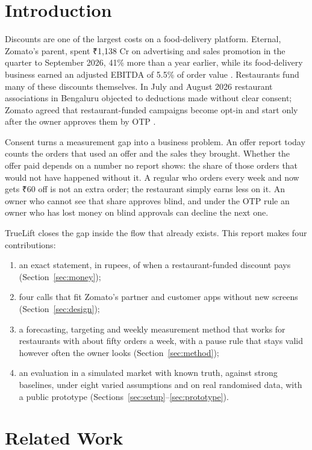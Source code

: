 \documentclass[conference]{IEEEtran}
\begin{document}
\section{Introduction}

Discounts are one of the largest costs on a food-delivery platform. Eternal, Zomato's parent, spent
₹1,138 Cr on advertising and sales promotion in the quarter to September 2026, 41\% more than a year
earlier, while its food-delivery business earned an adjusted EBITDA of 5.5\% of order value
\cite{eternal}. Restaurants fund many of these discounts themselves. In July and August 2026 restaurant
associations in Bengaluru objected to deductions made without clear consent; Zomato agreed that
restaurant-funded campaigns become opt-in and start only after the owner approves them by OTP
\cite{angelone,theweek}.

Consent turns a measurement gap into a business problem. An offer report today counts the orders that
used an offer and the sales they brought. Whether the offer paid depends on a number no report shows:
the share of those orders that would not have happened without it. A regular who orders every week
and now gets ₹60 off is not an extra order; the restaurant simply earns less on it. An owner who cannot
see that share approves blind, and under the OTP rule an owner who has lost money on blind approvals can
decline the next one.

TrueLift closes the gap inside the flow that already exists. This report makes four contributions:
\begin{enumerate}
\item an exact statement, in rupees, of when a restaurant-funded discount pays (Section~\ref{sec:money});
\item four calls that fit Zomato's partner and customer apps without new screens (Section~\ref{sec:design});
\item a forecasting, targeting and weekly measurement method that works for restaurants with about
fifty orders a week, with a pause rule that stays valid however often the owner looks (Section~\ref{sec:method});
\item an evaluation in a simulated market with known truth, against strong baselines, under eight varied
assumptions and on real randomised data, with a public prototype (Sections~\ref{sec:setup}--\ref{sec:prototype}).
\end{enumerate}

\section{Related Work}
\end{document}
